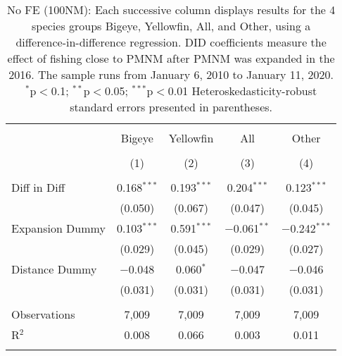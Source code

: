 
\begin{table}[!htbp] \centering 
  \caption{No FE (100NM): Each successive column displays results for the 4 species groups Bigeye, Yellowfin, All, and Other, using a difference-in-difference regression. DID coefficients measure the effect of fishing close to PMNM after PMNM was expanded in the 2016. The sample runs from January 6, 2010 to January 11, 2020. $^{*}$p$<$0.1; $^{**}$p$<$0.05; $^{***}$p$<$0.01 Heteroskedasticity-robust standard errors presented in parentheses.} 
  \label{tbl:noFE100NM} 
\begin{tabular}{@{\extracolsep{5pt}}lcccc} 
\\[-1.8ex]\hline 
\hline \\[-1.8ex] 
 & Bigeye & Yellowfin & All & Other \\ 
\\[-1.8ex] & (1) & (2) & (3) & (4)\\ 
\hline \\[-1.8ex] 
 Diff in Diff & 0.168$^{***}$ & 0.193$^{***}$ & 0.204$^{***}$ & 0.123$^{***}$ \\ 
  & (0.050) & (0.067) & (0.047) & (0.045) \\ 
  Expansion Dummy & 0.103$^{***}$ & 0.591$^{***}$ & $-$0.061$^{**}$ & $-$0.242$^{***}$ \\ 
  & (0.029) & (0.045) & (0.029) & (0.027) \\ 
  Distance Dummy & $-$0.048 & 0.060$^{*}$ & $-$0.047 & $-$0.046 \\ 
  & (0.031) & (0.031) & (0.031) & (0.031) \\ 
 \hline \\[-1.8ex] 
Observations & 7,009 & 7,009 & 7,009 & 7,009 \\ 
R$^{2}$ & 0.008 & 0.066 & 0.003 & 0.011 \\ 
\hline 
\hline \\[-1.8ex] 
\end{tabular} 
\end{table} 
